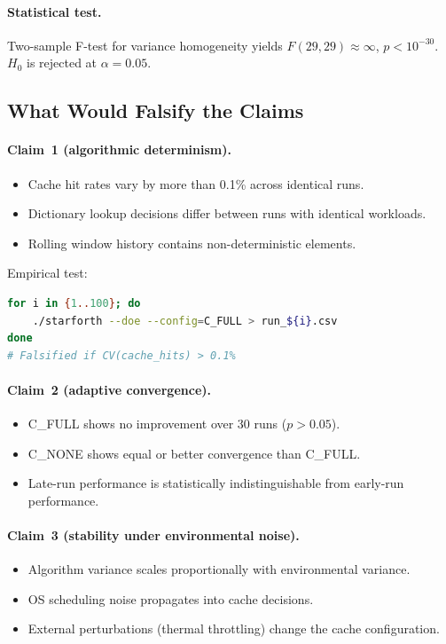 \paragraph{Statistical test.}
Two-sample F-test for variance homogeneity yields $F(29, 29) \approx \infty$,
$p < 10^{-30}$. $H_0$ is rejected at $\alpha = 0.05$.

\subsection{What Would Falsify the Claims}

\paragraph{Claim~1 (algorithmic determinism).}
\begin{itemize}
  \item Cache hit rates vary by more than 0.1\% across identical runs.
  \item Dictionary lookup decisions differ between runs with identical workloads.
  \item Rolling window history contains non-deterministic elements.
\end{itemize}

Empirical test:
\begin{lstlisting}[language=bash]
for i in {1..100}; do
    ./starforth --doe --config=C_FULL > run_${i}.csv
done
# Falsified if CV(cache_hits) > 0.1%
\end{lstlisting}

\paragraph{Claim~2 (adaptive convergence).}
\begin{itemize}
  \item C\_FULL shows no improvement over 30 runs ($p > 0.05$).
  \item C\_NONE shows equal or better convergence than C\_FULL.
  \item Late-run performance is statistically indistinguishable from early-run
    performance.
\end{itemize}

\paragraph{Claim~3 (stability under environmental noise).}
\begin{itemize}
  \item Algorithm variance scales proportionally with environmental variance.
  \item OS scheduling noise propagates into cache decisions.
  \item External perturbations (thermal throttling) change the cache configuration.
\end{itemize}

